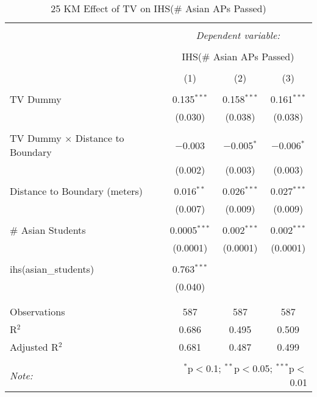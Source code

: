 
\begin{table}[!htbp] \centering 
  \caption{25 KM Effect of TV on IHS(\# Asian APs Passed)} 
  \label{} 
\begin{tabular}{@{\extracolsep{-2pt}}lccc} 
\\[-1.8ex]\hline 
\hline \\[-1.8ex] 
 & \multicolumn{3}{c}{\textit{Dependent variable:}} \\ 
\cline{2-4} 
\\[-1.8ex] & \multicolumn{3}{c}{IHS(\# Asian APs Passed)} \\ 
\\[-1.8ex] & (1) & (2) & (3)\\ 
\hline \\[-1.8ex] 
 TV Dummy & 0.135$^{***}$ & 0.158$^{***}$ & 0.161$^{***}$ \\ 
  & (0.030) & (0.038) & (0.038) \\ 
  & & & \\ 
 TV Dummy $\times$ Distance to Boundary & $-$0.003 & $-$0.005$^{*}$ & $-$0.006$^{*}$ \\ 
  & (0.002) & (0.003) & (0.003) \\ 
  & & & \\ 
 Distance to Boundary (meters) & 0.016$^{**}$ & 0.026$^{***}$ & 0.027$^{***}$ \\ 
  & (0.007) & (0.009) & (0.009) \\ 
  & & & \\ 
 \# Asian Students & 0.0005$^{***}$ & 0.002$^{***}$ & 0.002$^{***}$ \\ 
  & (0.0001) & (0.0001) & (0.0001) \\ 
  & & & \\ 
 ihs(asian\_students) & 0.763$^{***}$ &  &  \\ 
  & (0.040) &  &  \\ 
  & & & \\ 
\hline \\[-1.8ex] 
Observations & 587 & 587 & 587 \\ 
R$^{2}$ & 0.686 & 0.495 & 0.509 \\ 
Adjusted R$^{2}$ & 0.681 & 0.487 & 0.499 \\ 
\hline 
\hline \\[-1.8ex] 
\textit{Note:}  & \multicolumn{3}{r}{$^{*}$p$<$0.1; $^{**}$p$<$0.05; $^{***}$p$<$0.01} \\ 
\end{tabular} 
\end{table} 
